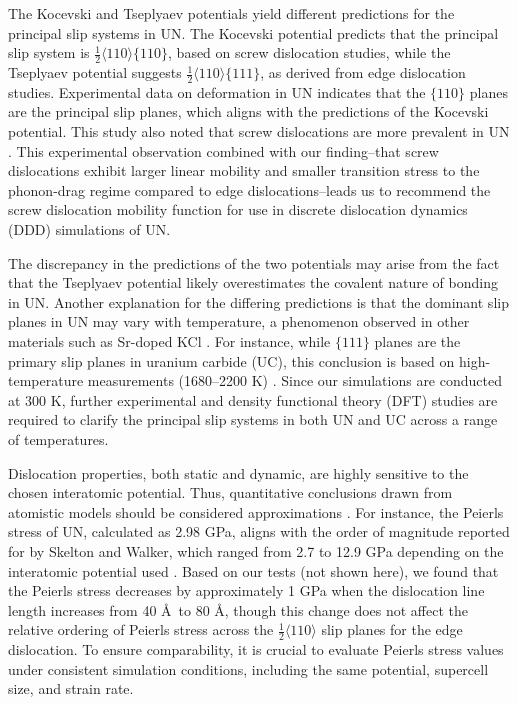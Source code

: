 \documentclass[applsci,article,submit,pdftex,moreauthors]{Definitions/mdpi}
\newcommand{\?}{\stackrel{?}{=}}
\begin{document}
The Kocevski and Tseplyaev potentials yield different predictions for the principal slip systems in UN. The Kocevski potential predicts that the principal slip system is $\frac{1}{2} \langle 110 \rangle \{110\}$, based on screw dislocation studies, while the Tseplyaev potential suggests $\frac{1}{2} \langle 110 \rangle \{111\}$, as derived from edge dislocation studies. Experimental data \cite{Sole1968} on deformation in UN indicates that the $\{110\}$ planes are the principal slip planes, which aligns with the predictions of the Kocevski potential. This study also noted that screw dislocations are more prevalent in UN \cite{Sole1968}. This experimental observation combined with our finding--that screw dislocations exhibit larger linear mobility and smaller transition stress to the phonon-drag regime compared to edge dislocations--leads us to recommend the screw dislocation mobility function for use in discrete dislocation dynamics (DDD) simulations of UN.

The discrepancy in the predictions of the two potentials may arise from the fact that the Tseplyaev potential likely overestimates the covalent nature of bonding in UN. Another explanation for the differing predictions is that the dominant slip planes in UN may vary with temperature, a phenomenon observed in other materials such as Sr-doped KCl \cite{Haasen1985}. For instance, while $\{111\}$ planes are the primary slip planes in uranium carbide (UC), this conclusion is based on high-temperature measurements (1680–2200 K) \cite{Vasudevamurthy2022}. Since our simulations are conducted at 300 K, further experimental and density functional theory (DFT) studies are required to clarify the principal slip systems in both UN and UC across a range of temperatures.

Dislocation properties, both static and dynamic, are highly sensitive to the chosen interatomic potential. Thus, quantitative conclusions drawn from atomistic models should be considered approximations \cite{Puls1976, Liu2012}. For instance, the Peierls stress of UN, calculated as 2.98 GPa, aligns with the order of magnitude reported for  by Skelton and Walker, which ranged from 2.7 to 12.9 GPa depending on the interatomic potential used \cite{Skelton2017}. Based on our tests (not shown here), we found that the Peierls stress decreases by approximately 1 GPa when the dislocation line length increases from 40 \AA\ to 80 \AA, though this change does not affect the relative ordering of Peierls stress across the $\frac{1}{2}\langle110\rangle$ slip planes for the edge dislocation. To ensure comparability, it is crucial to evaluate Peierls stress values under consistent simulation conditions, including the same potential, supercell size, and strain rate.
\end{document}
